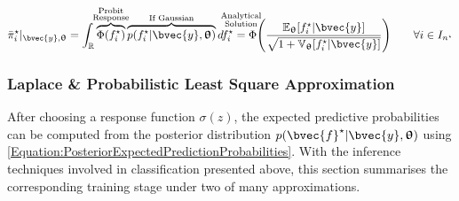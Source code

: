 \begin{equation}
					 \bar{\pi}^{\star}_{i} |_{\bvec{y}, \vec{\uptheta}} = \int_{\mathbb{R}} \overbrace{\Phi(f^{\star}_{i})}^{\mathclap{\substack{\text{Probit} \\ \text{Response}}}} \overbrace{p(f^{\star}_{i} | \bvec{y}, \vec{\uptheta})}^{\text{If Gaussian}} d f^{\star}_{i} \stackrel{\mathclap{\substack{\text{Analytical} \\ \text{Solution} \\ \quad }}}{=} \Phi\Bigg(\frac{\mathbb{E}_{\vec{\uptheta}}[f^{\star}_{i} | \bvec{y}]}{\sqrt{1 + \mathbb{V}_{\vec{\uptheta}}[f^{\star}_{i} | \bvec{y}]}}\Bigg) \qquad \forall i \in I_{n^{\star}}
				\label{Equation:ProbitAnalyticalIntegral}
				\end{equation}
				
			\subsubsection{Laplace \& Probabilistic Least Square Approximation}
			\label{BenthicHabitatMapping:Classification:Approximation}
			
				After choosing a response function $\sigma(z)$, the expected predictive probabilities can be computed from the posterior distribution $p(\bvec{f}^{\star} | \bvec{y}, \vec{\uptheta})$ using \eqref{Equation:PosteriorExpectedPredictionProbabilities}. With the inference techniques involved in classification  presented above, this section summarises the corresponding training stage under two of many approximations.
				
